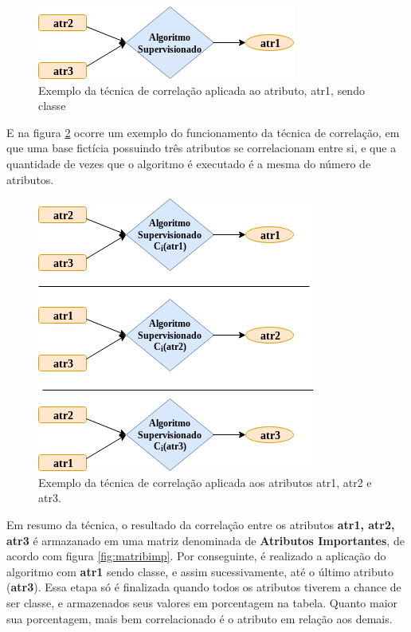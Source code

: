 \begin{figure}[h!]
        \centering
        \includegraphics[scale=0.7]{figs/tecnicamodelo.png}
        \caption{Exemplo da técnica de correlação aplicada ao atributo, atr1, sendo classe } \label{fig:tecnicamodelo}
\end{figure}

E na figura \ref{fig:tecnicamodelocomp} ocorre um exemplo do funcionamento da técnica de correlação, em que uma base fictícia possuindo três atributos se correlacionam entre si, e que a quantidade de vezes que o algoritmo é executado é a mesma do número de atributos.

\begin{figure}[h!]
        \centering
        \includegraphics[scale=0.7]{figs/tecnicamodeloComp.png}
        \caption{Exemplo da técnica de correlação aplicada aos atributos atr1, atr2 e atr3. } \label{fig:tecnicamodelocomp}
\end{figure}


Em resumo da técnica, o resultado da correlação entre os atributos \textbf{atr1, atr2, atr3}  é armazanado em uma matriz denominada de \textbf{Atributos Importantes}, de acordo com figura \ref{fig:matribimp}. Por conseguinte, é realizado a aplicação do algoritmo com \textbf{atr1} sendo classe, e assim sucessivamente, até o último atributo (\textbf{atr3}). Essa etapa só é finalizada quando todos os atributos tiverem a chance de ser classe, e armazenados seus valores em porcentagem na tabela. Quanto maior sua porcentagem, mais bem correlacionado é o atributo em relação aos demais.


